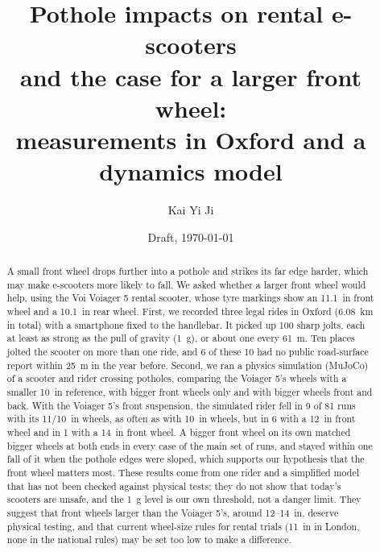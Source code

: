 \documentclass[11pt,a4paper]{article}
\title{Pothole impacts on rental e-scooters\\
       and the case for a larger front wheel:\\
       measurements in Oxford and a dynamics model}
\author{Kai Yi Ji}
\date{Draft, \today}
\newcounter{none}   %
\newcommand{\appendixnumbering}{%
  \counterwithin*{figure}{section}\counterwithin*{table}{section}%
  \renewcommand{\thefigure}{\Alph{section}\arabic{figure}}%
  \renewcommand{\thetable}{\Alph{section}\arabic{table}}}
\begin{document}
\maketitle

\begin{abstract}
\noindent A small front wheel drops further into a pothole and strikes its far edge harder,
which may make e-scooters more likely to fall. We asked whether a larger front wheel would
help, using the Voi Voiager 5 rental scooter, whose tyre markings show an 11.1~in front wheel
and a 10.1~in rear wheel. First, we recorded three legal rides in Oxford (6.08~km in total)
with a smartphone fixed to the handlebar. It picked up 100 sharp jolts, each at least as
strong as the pull of gravity (1~g), or about one every 61~m. Ten places jolted the scooter
on more than one ride, and 6 of these 10 had no public road-surface report within 25~m in the
year before. Second, we ran a physics simulation (MuJoCo) of a scooter and rider crossing
potholes, comparing the Voiager 5's wheels with a smaller 10~in reference, with bigger front
wheels only and with bigger wheels front and back. With the Voiager 5's front suspension,
the simulated rider fell in 9 of 81 runs with its 11/10~in wheels, as often as with 10~in
wheels, but in 6 with a 12~in front wheel and in 1 with a 14~in front wheel. A bigger front
wheel on its own matched bigger wheels at both ends in every case of the main set of runs,
and stayed within one fall of it when the pothole edges were sloped, which supports our
hypothesis that the front wheel matters most. These results come from one rider and a
simplified model that has not been checked against physical tests; they do not show that
today's scooters are unsafe, and the 1~g level is our own threshold, not a danger limit.
They suggest that front wheels larger than the Voiager 5's, around 12--14~in, deserve
physical testing, and that current wheel-size rules for rental trials (11~in in London,
none in the national rules) may be set too low to make a difference.
\end{abstract}







\printbibliography[heading=bibintoc]

\clearpage
\appendix
\appendixnumbering




\end{document}
